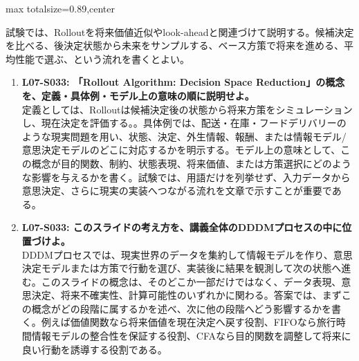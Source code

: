 \begin{minipage}[t]{0.58\textwidth}
\begin{adjustbox}{max totalsize={\textwidth}{0.89\textheight},center}
\begin{minipage}{\textwidth}
試験では、Rolloutを将来価値近似やlook-aheadと関連づけて説明する。候補決定を比べる、後決定状態から未来をサンプルする、ベース方策で将来を進める、平均性能で選ぶ、という流れを書くとよい。\par{}\begin{enumerate}\item \textbf{L07-S033: 「Rollout Algorithm: Decision Space Reduction」の概念を、定義・具体例・モデル上の意味の順に説明せよ。}\\定義としては、Rolloutは候補決定後の状態から将来方策をシミュレーションし、現在決定を評価する。。具体例では、配送・在庫・フードデリバリーのような現実問題を用い、状態、決定、外生情報、報酬、または情報モデル/意思決定モデルのどこに対応するかを明示する。モデル上の意味として、この概念が目的関数、制約、状態表現、将来価値、または方策選択にどのような影響を与えるかを書く。試験では、用語だけを列挙せず、入力データから意思決定、さらに現実の実装へつながる流れを文章で示すことが重要である。\item \textbf{L07-S033: このスライドの考え方を、講義全体のDDDMプロセスの中に位置づけよ。}\\DDDMプロセスでは、現実世界のデータを集約して情報モデルを作り、意思決定モデルまたは方策で行動を選び、実装後に結果を観測して次の状態へ進む。このスライドの概念は、そのどこか一部だけではなく、データ表現、意思決定、将来不確実性、計算可能性のいずれかに関わる。答案では、まずこの概念がどの段階に属するかを述べ、次に他の段階へどう影響するかを書く。例えば価値関数なら将来価値を現在決定へ戻す役割、FIFOなら旅行時間情報モデルの整合性を保証する役割、CFAなら目的関数を調整して将来に良い行動を誘導する役割である。\end{enumerate}
\end{minipage}
\end{adjustbox}
\end{minipage}


